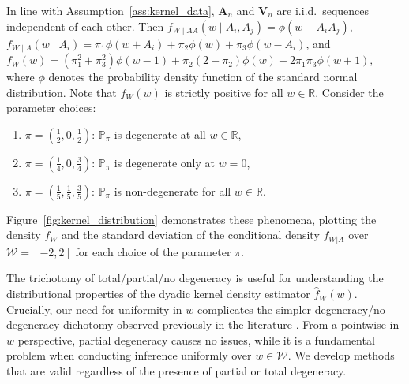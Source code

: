 \documentclass[11pt,lof]{puthesis}
\renewcommand{\P}{\ensuremath{\mathbb{P}}}
\newcommand{\R}{\ensuremath{\mathbb{R}}}
\newcommand{\bA}{\ensuremath{\mathbf{A}}}
\newcommand{\bV}{\ensuremath{\mathbf{V}}}
\newcommand{\cW}{\ensuremath{\mathcal{W}}}
\theoremstyle{break}
\theoremstyle{proof}
\begin{document}
In line with Assumption~\ref{ass:kernel_data}, $\bA_n$ and $\bV_n$ are i.i.d.\
sequences independent of each other. Then
$f_{W \mid AA}(w \mid A_i, A_j) = \phi(w - A_i A_j)$,\,
$f_{W \mid A}(w \mid A_i) = \pi_1 \phi(w + A_i) + \pi_2 \phi(w)
+ \pi_3 \phi(w - A_i)$, and
$f_W(w) = (\pi_1^2 + \pi_3^2) \phi(w-1) + \pi_2 (2 - \pi_2) \phi(w) + 2
\pi_1 \pi_3 \phi(w+1),$
where $\phi$ denotes the probability density function of the standard normal
distribution. Note that $f_W(w)$ is strictly positive for all $w \in \R$.
Consider the parameter choices:
%
\begin{enumerate}[label=(\roman*)]

\item $\pi = \left( \frac{1}{2}, 0, \frac{1}{2} \right)$:\quad
$\P_\pi$ is degenerate at all $w \in \R$,

\item $\pi = \left( \frac{1}{4}, 0, \frac{3}{4} \right)$:\quad
$\P_\pi$ is degenerate only at $w=0$,

\item $\pi = \left( \frac{1}{5}, \frac{1}{5}, \frac{3}{5} \right)$:\quad
$\P_\pi$ is non-degenerate for all $w \in \R$.

\end{enumerate}
%
Figure~\ref{fig:kernel_distribution} demonstrates these phenomena, plotting the
density $f_W$ and the standard deviation of the conditional
density $f_{W|A}$ over $\cW = [-2,2]$ for each choice of the parameter $\pi$.

The trichotomy of total/partial/no degeneracy is useful for understanding the
distributional properties of the dyadic kernel density estimator
$\hat{f}_W(w)$. Crucially, our need for uniformity in $w$ complicates the
simpler degeneracy/no degeneracy dichotomy observed previously in the
literature \citep{graham2024kernel}. From a pointwise-in-$w$
perspective, partial degeneracy causes no issues, while it is a fundamental
problem when conducting inference uniformly over $w \in \cW$. We develop
methods that are valid regardless of the presence of partial or total
degeneracy.
\end{document}
